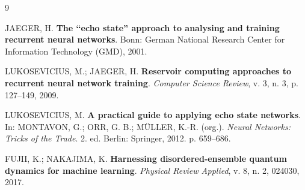 \documentclass[12pt]{article}
\begin{document}
\begin{thebibliography}{9}

JAEGER, H. \textbf{The ``echo state'' approach to analysing and training recurrent neural networks}. Bonn: German National Research Center for Information Technology (GMD), 2001.

LUKOSEVICIUS, M.; JAEGER, H. \textbf{Reservoir computing approaches to recurrent neural network training}. \emph{Computer Science Review}, v. 3, n. 3, p. 127--149, 2009.

LUKOSEVICIUS, M. \textbf{A practical guide to applying echo state networks}. In: MONTAVON, G.; ORR, G. B.; MÜLLER, K.-R. (org.). \emph{Neural Networks: Tricks of the Trade}. 2. ed. Berlin: Springer, 2012. p. 659--686.

FUJII, K.; NAKAJIMA, K. \textbf{Harnessing disordered-ensemble quantum dynamics for machine learning}. \emph{Physical Review Applied}, v. 8, n. 2, 024030, 2017.

\end{thebibliography}

            
\end{document}
